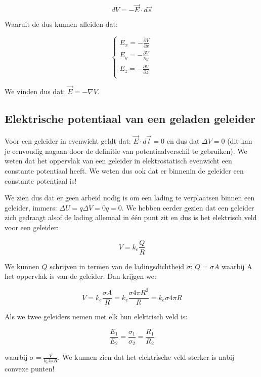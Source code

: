 \documentclass[12pt,a4paper]{article}
\begin{document}
    $$dV = -\vec{E} \cdot d\vec{s}$$
    
    Waaruit de dus kunnen afleiden dat:
    
    \begin{equation}
    	\begin{cases}
      		E_{x} = -\frac{\partial V}{\partial x}\\
      		E_{y} = -\frac{\partial V}{\partial y}\\
      		E_{z} = -\frac{\partial V}{\partial z}\\
    	\end{cases}\,
    \end{equation}
    
    We vinden dus dat: $\vec{E} = -\mathbb{\nabla}{V}$.
    
    \subsection{Elektrische potentiaal van een geladen geleider}
    Voor een geleider in evenwicht geldt dat: $\vec{E} \cdot d\vec{l} = 0$ en dus dat $\Delta V = 0$ (dit kan
    je eenvoudig nagaan door de definitie van potentiaalverschil te gebruiken). We weten dat het oppervlak van een
    geleider in elektrostatisch evenwicht een constante potentiaal heeft. We weten dus ook dat er binnenin de geleider
    een constante potentiaal is! 
    
    We zien dus dat er geen arbeid nodig is om een lading te verplaatsen binnen een geleider, immers: $\Delta U = q\Delta V = 0q = 0$.
    We hebben eerder gezien dat een geleider zich gedraagt alsof de lading allemaal in één punt zit en dus is het elektrisch veld voor een
    geleider:
    
    $$V = k_{e}\frac{Q}{R}$$
    
    We kunnen $Q$ schrijven in termen van de ladingsdichtheid $\sigma$: $Q = \sigma A$ waarbij A het oppervlak is van de geleider. Dan krijgen we:
    
    $$V = k_{e}\frac{\sigma A}{R} = k_{e} \frac{\sigma 4\pi R^{2}}{R} = k_{e}\sigma 4 \pi R$$
    
    Als we twee geleiders nemen met elk hun elektrisch veld is:
    
    $$\frac{E_{1}}{E_{2}} = \frac{\sigma_{1}}{\sigma_{2}} = \frac{R_{1}}{R_{2}}$$ 
    
    waarbij $\sigma = \frac{V}{k_{e}4\pi R}$. We kunnen zien dat het elektrische veld sterker is
    nabij convexe punten!
\end{document}
